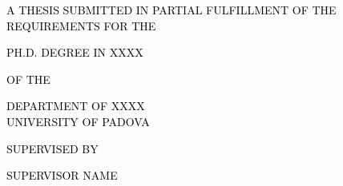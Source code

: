 \begin{titlepage}
  \makeatletter

  {
    \sffamily%
    \fontsize{24}{24}\selectfont\par\noindent\textcolor{black}{\textsc{\@author}}%
    \vspace{1cm}%
    \fontsize{42}{36}\selectfont\par\noindent{\MakeUppercase{\@title}}%
  }

  \vspace{9cm}
  {
    \sffamily%
    \fontsize{10}{15}\selectfont\par\noindent\textcolor{black}
    {\MakeUppercase{A thesis submitted in partial fulfillment of the requirements for the}}
    \vspace{-0.5cm}%
    \fontsize{15}{15}\selectfont\par\noindent\textcolor{black}
    {\MakeUppercase{Ph.D. Degree in XXXX}}
    \vspace{0.1cm}%
    \fontsize{10}{15}\selectfont\par\noindent\textcolor{black}
    {\MakeUppercase{of the}}
    \vspace{0.1cm}
    \fontsize{15}{15}\selectfont\par\noindent\textcolor{black}
    {\MakeUppercase{Department of XXXX\\University of Padova}}%
    \vspace{0.1cm}%
    \fontsize{10}{15}\selectfont\par\noindent\textcolor{black}
    {\MakeUppercase{supervised by}}
    \vspace{0.1cm}%
    \fontsize{15}{15}\selectfont\par\noindent\textcolor{black}
    {\MakeUppercase{Supervisor name}}%
  }

  \vspace*{\fill}
  {
    \sffamily%
    \fontsize{10}{10}\selectfont\par{}%
    \fontsize{10}{10}\selectfont\par{}%
  }
  \makeatother
\end{titlepage}

